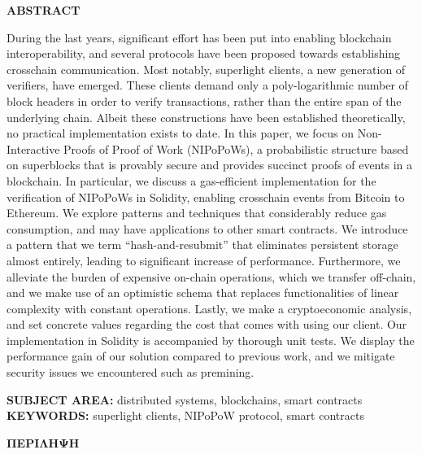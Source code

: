 \begin{center}
\large{\textbf{ABSTRACT}}
\end{center}

During the last years, significant effort has been put into enabling blockchain
interoperability, and several protocols have been proposed towards establishing
crosschain communication. Most notably, superlight clients, a new generation of
verifiers, have emerged. These clients demand only a poly-logarithmic number of
block headers in order to verify transactions, rather than the entire span of
the underlying chain. Albeit these constructions have been established
theoretically, no practical implementation exists to date. In this paper, we
focus on Non-Interactive Proofs of Proof of Work (NIPoPoWs), a probabilistic
structure based on superblocks that is provably secure and provides succinct
proofs of events in a blockchain. In particular, we discuss a gas-efficient
implementation for the verification of NIPoPoWs in Solidity, enabling
crosschain events from Bitcoin to Ethereum. We explore patterns and techniques
that considerably reduce gas consumption, and may have applications to other
smart contracts. We introduce a pattern that we term ``hash-and-resubmit'' that
eliminates persistent storage almost entirely, leading to significant increase
of performance. Furthermore, we alleviate the burden of expensive on-chain
operations, which we transfer off-chain, and we make use of an optimistic
schema that replaces functionalities of linear complexity with constant
operations. Lastly, we make a cryptoeconomic analysis, and set concrete values
regarding the cost that comes with using our client. Our implementation in
Solidity is accompanied by thorough unit tests. We display the performance gain
of our solution compared to previous work, and we mitigate security issues we
encountered such as premining.

\vspace{8.5cm}
\noindent
\textbf{SUBJECT AREA:} distributed systems, blockchains, smart contracts\\
\textbf{KEYWORDS:} superlight clients, NIPoPoW protocol, smart contracts

\newpage

\begin{center}
\large{\textbf{ΠΕΡIΛΗΨΗ}}
\end{center}

